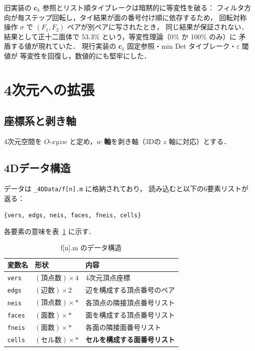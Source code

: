 \documentclass[12pt,a4paper]{article}
\theoremstyle{definition}
\begin{document}
旧実装の $\mathbf{c}_k$ 参照とリスト順タイブレークは暗黙的に等変性を破る：
フィルタ方向が毎ステップ回転し，タイ結果が面の番号付け順に依存するため，
回転対称操作 $\sigma$ で $(F_1,F_2)$ ペアが別ペアに写されたとき，
同じ結果が保証されない．
結果として正十二面体で 53.3\% という，等変性理論（0\% か 100\% のみ）に
矛盾する値が現れていた．
現行実装の $\mathbf{c}_1$ 固定参照・min Det タイブレーク・$\varepsilon$ 閾値が
等変性を回復し，数値的にも堅牢にした．

\section{4次元への拡張}

\subsection{座標系と剥き軸}

4次元空間を $O\text{-}xyzw$ と定め，\textbf{$w$ 軸}を剥き軸（3Dの $z$ 軸に対応）とする．

\subsection{4Dデータ構造}

データは \texttt{\_4DData/f[n].m} に格納されており，
読み込むと以下の6要素リストが返る：

\begin{center}
\texttt{\{vers, edgs, neis, faces, fneis, cells\}}
\end{center}

\noindent 各要素の意味を表~\ref{tab:data} に示す．

\begin{table}[h]
\centering
\caption{f[n].m のデータ構造}
\label{tab:data}
\begin{tabular}{lll}
\toprule
変数名 & 形状 & 内容 \\
\midrule
\texttt{vers}  & $(\text{頂点数}) \times 4$ & 4次元頂点座標 \\
\texttt{edgs}  & $(\text{辺数}) \times 2$   & 辺を構成する頂点番号のペア \\
\texttt{neis}  & $(\text{頂点数}) \times *$  & 各頂点の隣接頂点番号リスト \\
\texttt{faces} & $(\text{面数}) \times *$    & 面を構成する頂点番号リスト \\
\texttt{fneis} & $(\text{面数}) \times *$    & 各面の隣接面番号リスト \\
\texttt{cells} & $(\text{セル数}) \times *$  & \textbf{セルを構成する面番号リスト} \\
\bottomrule
\end{tabular}
\end{table}
\end{document}
